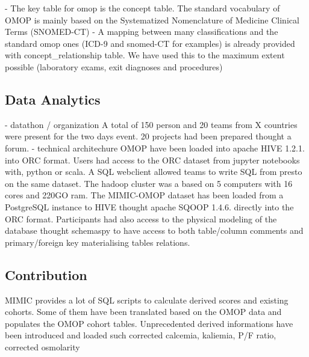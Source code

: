 - The key table for omop is the concept table. The standard vocabulary of OMOP
is mainly based on the Systematized Nomenclature of Medicine Clinical Terms
(SNOMED-CT)
- A mapping between many classifications and the standard omop ones (ICD-9 and
snomed-CT for examples) is already provided with concept_relationship table. We
have used this to the maximum extent possible (laboratory exams, exit diagnoses
and procedures)

\subsection{Data Analytics}
- datathon / organization
A total of 150 person and 20 teams from X countries were present for the two
days event. 20 projects had been prepared thought a forum.
- technical architechure
OMOP have been loaded into apache HIVE 1.2.1. into ORC format. Users had access
to the ORC dataset from jupyter notebooks with, python or scala. A SQL
webclient allowed teams to write SQL from presto on the same dataset. The
hadoop cluster was a based on 5 computers with 16 cores and 220GO ram.
The MIMIC-OMOP dataset has been loaded from a PostgreSQL instance to HIVE
thought apache SQOOP 1.4.6. directly into the ORC format. 
Participants had also access to the physical modeling of the database thought
schemaspy to have access to both table/column comments and primary/foreign key
materialising tables relations.
\subsection{Contribution}
MIMIC provides a lot of SQL scripts to calculate derived scores and existing
cohorts. Some of them have been translated based on the OMOP data and
populates the OMOP cohort tables.
Unprecedented derived informations have been introduced and loaded such
corrected calcemia, kaliemia, P/F ratio, corrected osmolarity

